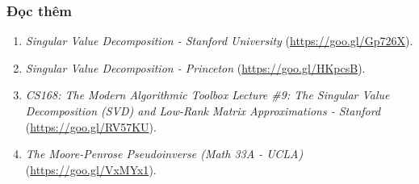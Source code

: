 \subsubsection{Đọc thêm}
\begin{enumerate}
    \item \textit{Singular Value Decomposition - Stanford University} (\url{https://goo.gl/Gp726X}).

    \item \textit{Singular Value Decomposition - Princeton} (\url{https://goo.gl/HKpcsB}).

    \item \textit{CS168: The Modern Algorithmic Toolbox Lecture \#9: The Singular
    Value Decomposition (SVD) and Low-Rank Matrix Approximations - Stanford}
    (\url{https://goo.gl/RV57KU}).

    \item \textit{The Moore-Penrose Pseudoinverse (Math 33A - UCLA)} (\url{https://goo.gl/VxMYx1}).
\end{enumerate}
